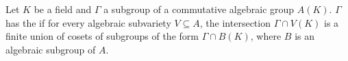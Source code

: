 Let $K$ be a field and $\Gamma$ a subgroup of a commutative algebraic group $A(K)$. $\Gamma$ has the  if for every algebraic subvariety $V \subseteq A$, the intersection $\Gamma \cap V(K)$ is a finite union of cosets of subgroups of the form $\Gamma \cap B(K)$, where $B$ is an algebraic subgroup of $A$.
